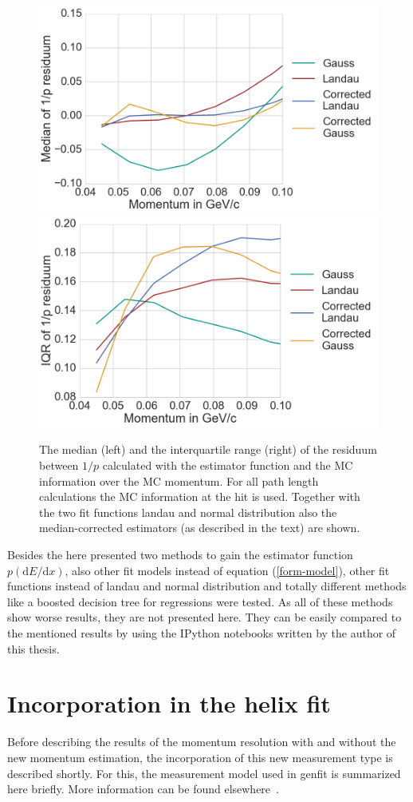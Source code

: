 \begin{figure}
  \centering
   \includegraphics[width=0.47\linewidth]{figures/vxd/divPMedian.png}
   \includegraphics[width=0.47\linewidth]{figures/vxd/divPIQR.png}
  \caption[Median and IQR of $1/p$.]{The median (left) and the interquartile range (right) of the residuum between $1/p$ calculated with the estimator function and the MC information over the MC momentum. For all path length calculations the MC information at the hit is used. Together with the two fit functions landau and normal distribution also the median-corrected estimators (as described in the text) are shown.}
  \label{fig-divp-residuum}
\end{figure}


Besides the here presented two methods to gain the estimator function $p(\mathrm dE/\mathrm dx)$, also other fit models instead of equation (\ref{form-model}), other fit functions instead of landau and normal distribution and totally different methods like a boosted decision tree for regressions were tested. As all of these methods show worse results, they are not presented here. They can be easily compared to the mentioned results by using the IPython notebooks written by the author of this thesis.

\section{Incorporation in the helix fit}

Before describing the results of the momentum resolution with and without the new momentum estimation, the incorporation of this new measurement type is described shortly. For this, the measurement model used in genfit is summarized here briefly. More information can be found elsewhere~\cite{genfit}.

